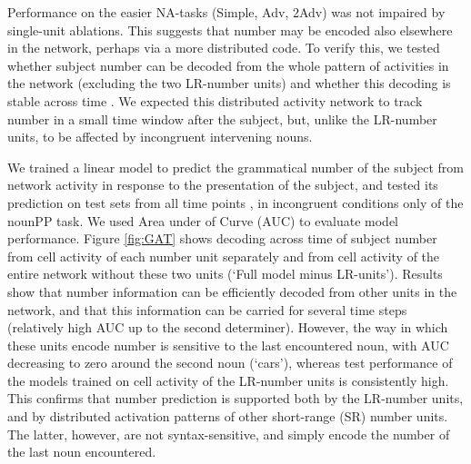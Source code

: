 Performance on the easier NA-tasks (Simple, Adv, 2Adv) was not
impaired by single-unit ablations. This suggests that number may be
encoded also elsewhere in the network, perhaps via a more distributed
code. To verify this, we tested whether subject number can be decoded from the whole
pattern of activities in the network (excluding the two LR-number units)
and whether this decoding is stable across time \cite[see][for similar
observations and related methods]{Giulianelli:etal:2018}. We expected
this distributed activity network to track number in a
small time window after the subject, but, unlike the LR-number units,
to be affected by incongruent intervening nouns.

We trained a linear model to predict the grammatical number of the
subject from network activity in response to the presentation of the
subject, and tested its prediction on test sets from all time points
\cite{King:Dehaene:2014}, in incongruent conditions only of the nounPP
task. We used Area under of Curve (AUC) to evaluate model
performance. Figure \ref{fig:GAT} shows decoding across time of
subject number from cell activity of each number unit separately and
from cell activity of the entire network without these two units
(`Full model minus LR-units'). Results show that number information
can be efficiently decoded from other units in the network, and that
this information can be carried for several time steps (relatively
high AUC up to the second determiner). However, the way in which these
units encode number is sensitive to the last encountered noun, with
AUC decreasing to zero around the second noun (`cars'), whereas test
performance of the models trained on cell activity of the LR-number
units is consistently high. This confirms that number prediction is
supported both by the LR-number units, and by distributed activation
patterns of other short-range (SR) number units. The latter, however,
are not syntax-sensitive, and simply encode the number of the last
noun encountered.


